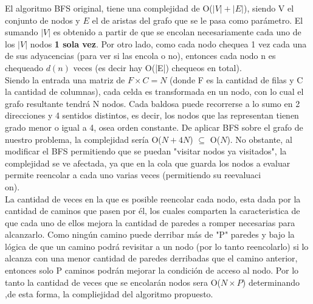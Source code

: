  El algoritmo BFS original, tiene una complejidad de O($|V|+|E|$), siendo V el conjunto de nodos y $E$ el de aristas del grafo que se le pasa como parámetro. El sumando $|V|$ es obtenido a partir de que se encolan necesariamente cada uno de los $|V|$ nodos {\bf 1 sola vez}. Por otro lado, como cada nodo chequea 1 vez cada una de sus adyacencias (para ver si las encola o no), entonces cada nodo n es chequeado $d(n)$ veces (es decir hay O(|E|) chequeos en total). \\

Siendo la entrada una matriz de $F \times C = N$ (donde F es la cantidad de filas y C la cantidad de columnas), cada celda es transformada en un nodo, con lo cual el grafo resultante tendrá N nodos. Cada baldosa puede recorrerse a lo sumo en 2 direcciones y 4 sentidos distintos, es decir, los nodos que las representan tienen grado menor o igual a 4, osea orden constante. De aplicar BFS sobre el grafo de nuestro problema, la complejidad sería O($N + 4N$) $\subseteq$ O($N$).
No obstante, al modificar el BFS permitiendo que se puedan "visitar nodos ya visitados", la complejidad se ve afectada, ya que en la cola que guarda los nodos a evaluar permite reencolar a cada uno varias veces (permitiendo su reevaluaci\\on).\\

La cantidad de veces en la que es posible reencolar cada nodo, esta dada por la cantidad de caminos que pasen por él, los cuales comparten la caracteristica de que cada uno de ellos mejora la cantidad de paredes a romper necesarias para alcanzarlo. Como ningún camino puede derribar más de "P" paredes y bajo la l\'ogica de que un camino podrá revisitar a un nodo (por lo tanto reencolarlo) si lo alcanza con una menor cantidad de paredes derribadas que el camino anterior, entonces solo P caminos podrán mejorar la condición de acceso al nodo. Por lo tanto la cantidad de veces que se encolarán nodos sera O($N \times P$) determinando ,de esta forma, la compliejidad del algoritmo propuesto.






